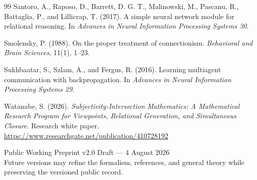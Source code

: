 \documentclass[11pt,a4paper]{article}
\begin{document}
\begin{thebibliography}{99}
Santoro, A., Raposo, D., Barrett, D. G. T., Malinowski, M., Pascanu, R., Battaglia, P., and Lillicrap, T. (2017). A simple neural network module for relational reasoning. In \emph{Advances in Neural Information Processing Systems 30}.

Smolensky, P. (1988). On the proper treatment of connectionism. \emph{Behavioral and Brain Sciences}, 11(1), 1--23.

Sukhbaatar, S., Szlam, A., and Fergus, R. (2016). Learning multiagent communication with backpropagation. In \emph{Advances in Neural Information Processing Systems 29}.

Watanabe, S. (2026). \emph{Subjectivity-Intersection Mathematics: A Mathematical Research Program for Viewpoints, Relational Generation, and Simultaneous Closure}. Research white paper. \url{https://www.researchgate.net/publication/410728192}

\end{thebibliography}

\vfill
\begin{center}
\small\sffamily
Public Working Preprint v2.0 Draft --- 4 August 2026\\
Future versions may refine the formalism, references, and general theory while preserving the versioned public record.
\end{center}
\end{document}
